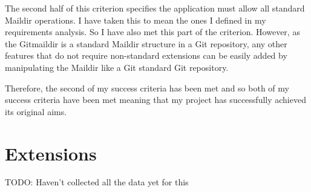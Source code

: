The second half of this criterion specifies the application must allow all standard Maildir operations. I have taken this to mean the ones I defined in my requirements analysis. So I have also met this part of the criterion. However, as the Gitmaildir is a standard Maildir structure in a Git repository, any other features that do not require non-standard extensions can be easily added by manipulating the Maildir like a Git standard Git repository.

Therefore, the second of my success criteria has been met and so both of my success criteria have been met meaning that my project has successfully achieved its original aims.

\section{Extensions}

TODO: Haven't collected all the data yet for this
